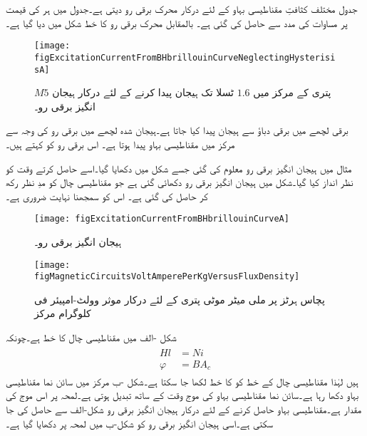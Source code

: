 جدول   مختلف کثافتِ مقناطیسی بہاو کے لئے درکار محرک برقی رو دیتی ہے۔جدول میں  ہر  کی قیمت پر   مساوات   کی مدد سے حاصل کی گئی ہے۔ بالمقابل محرک برقی رو کا خط شکل  میں دیا گیا ہے۔
%
\begin{figure}
\centering
\texttt{[image: figExcitationCurrentFromBHbrillouinCurveNeglectingHysterisisA]}
\caption{$M5$ پتری کے مرکز میں $1.6$ ٹسلا تک ہیجان پیدا کرنے کے لئے درکار ہیجان انگیز برقی رو۔}
\label{شکل_مقناطیسی_ادوار_ہیجان_رو_چال_نظرانداز}
\end{figure}
برقی لچھے میں برقی دباؤ سے ہیجان پیدا کیا جاتا ہے۔ہیجان شدہ لچھے میں برقی رو کی وجہ سے  مرکز میں مقناطیسی بہاو پیدا ہوتا ہے۔ اس برقی رو  کو   کہتے ہیں۔

مثال  میں ہیجان انگیز برقی رو معلوم کی گئی جسے شکل  میں دکھایا گیا۔اسے حاصل کرتے وقت  کو نظر انداز کیا گیا۔شکل  میں ہیجان انگیز برقی رو  دکھائی گئی ہے جو مقناطیسی چال کو مدِ نظر رکھ کر حاصل کی گئی ہے۔ اس کو سمجھنا نہایت ضروری ہے۔
\begin{figure}
\centering
\texttt{[image: figExcitationCurrentFromBHbrillouinCurveA]}
\caption{ہیجان انگیز برقی رو۔}
\label{شکل_مقناطیسی_ادوار_ہیجان_رو_بشمول_اثر_چال}
\end{figure}
%
\begin{figure}
\texttt{[image: figMagneticCircuitsVoltAmperePerKgVersusFluxDensity]}
\caption{پچاس ہرٹز پر  ملی میٹر موٹی پتری کے لئے درکار موثر وولٹ-امپیئر فی کلوگرام مرکز}
\label{شکل_مقناطیسی_دور_درکار_ہیجان_وولٹ_ایمپیئر}
\end{figure}
شکل -الف میں  مقناطیسی چال کا خط ہے۔چونکہ
\begin{gather}
\begin{aligned}
H l& =N i\\
\varphi&=B A_c
\end{aligned}
\end{gather}
ہیں لہٰذا مقناطیسی چال کے  خط کو  کا خط لکھا جا سکتا ہے۔شکل -ب مرکز میں سائن نما مقناطیسی بہاو  دکھا رہا ہے۔سائن نما مقناطیسی بہاو کی موج وقت کے ساتھ تبدیل ہوتی ہے۔لمحہ  پر اس موج کی مقدار   ہے۔مقناطیسی بہاو  حاصل کرنے کے لئے درکار ہیجان انگیز برقی رو  شکل-الف سے حاصل کی جا سکتی ہے۔اسی  ہیجان انگیز برقی رو کو شکل-ب میں  لمحہ  پر دکھایا گیا ہے۔ 

